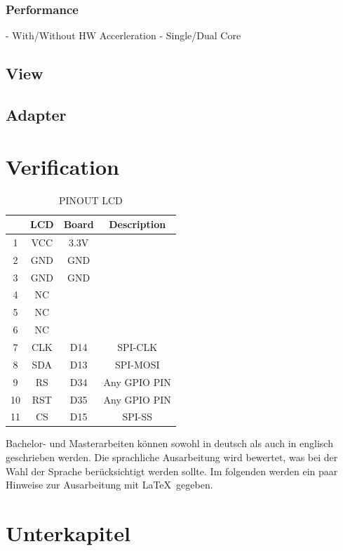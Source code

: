 \subsubsection{Performance}
- With/Without HW Accerleration
- Single/Dual Core
\subsection{View}
\subsection{Adapter}

\section{Verification}









\begin{table}[ht]
	\centering
	\begin{tabular}{|c|c|c|c|}
		\hline
		&LCD&Board&Description\\\hline
		1&VCC&3.3V\\\hline
		2&GND&GND\\\hline
		3&GND&GND\\\hline
		4&NC \\\hline
		5&NC \\\hline
		6&NC \\\hline
		7&CLK&D14&SPI-CLK\\\hline
		8&SDA&D13&SPI-MOSI\\\hline
		9&RS&D34&Any GPIO PIN\\\hline
		10&RST&D35&Any GPIO PIN\\\hline
		11&CS&D15&SPI-SS\\\hline
	\end{tabular}
	\caption{PINOUT LCD}
	\label{Tab:PINOUT_LCD}
\end{table}

Bachelor- und Masterarbeiten können sowohl in deutsch als auch in englisch geschrieben werden. 
Die sprachliche Ausarbeitung wird bewertet, was bei der Wahl der Sprache berücksichtigt werden sollte. 
Im folgenden werden ein paar Hinweise zur Ausarbeitung  mit \LaTeX\ gegeben.


\section{Unterkapitel}
